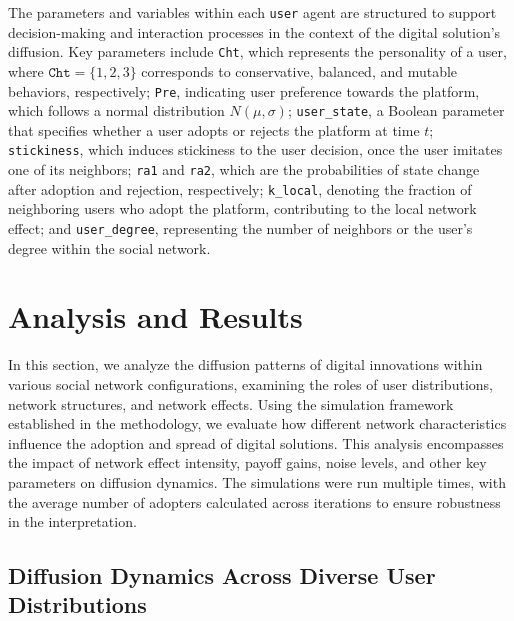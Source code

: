 \documentclass{article} %
\begin{document}
The parameters and variables within each \texttt{user} agent are structured to support decision-making and interaction processes in the context of the digital solution's diffusion. Key parameters include \texttt{Cht}, which represents the personality of a user, where \( \texttt{Cht} = \{1, 2, 3\} \) corresponds to conservative, balanced, and mutable behaviors, respectively; \texttt{Pre}, indicating user preference towards the platform, which follows a normal distribution \( N(\mu, \sigma) \); \texttt{user\_state}, a Boolean parameter that specifies whether a user adopts or rejects the platform at time \( t \); \texttt{stickiness}, which induces stickiness to the user decision, once the user imitates one of its neighbors; \texttt{ra1} and \texttt{ra2}, which are the probabilities of state change after adoption and rejection, respectively; \texttt{k\_local}, denoting the fraction of neighboring users who adopt the platform, contributing to the local network effect; and \texttt{user\_degree}, representing the number of neighbors or the user's degree within the social network.
\section{Analysis and Results}

In this section, we analyze the diffusion patterns of digital innovations within various social network configurations, examining the roles of user distributions, network structures, and network effects. Using the simulation framework established in the methodology, we evaluate how different network characteristics influence the adoption and spread of digital solutions. This analysis encompasses the impact of network effect intensity, payoff gains, noise levels, and other key parameters on diffusion dynamics. The simulations were run multiple times, with the average number of adopters calculated across iterations to ensure robustness in the interpretation.

\subsection{Diffusion Dynamics Across Diverse User Distributions}
\end{document}
